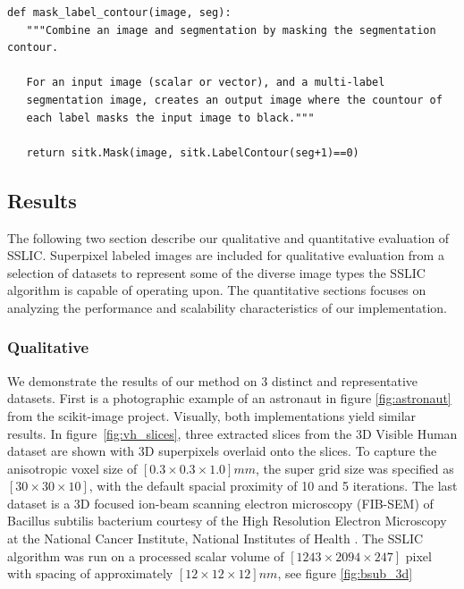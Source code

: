 \documentclass{InsightArticle}
\begin{document}
\begin{verbatim}
def mask_label_contour(image, seg):
   """Combine an image and segmentation by masking the segmentation contour.

   For an input image (scalar or vector), and a multi-label
   segmentation image, creates an output image where the countour of
   each label masks the input image to black."""

   return sitk.Mask(image, sitk.LabelContour(seg+1)==0)

\end{verbatim}


\subsection{Results}

The following two section describe our qualitative and quantitative evaluation
of SSLIC. Superpixel labeled images are included for qualitative evaluation from
a selection of datasets to represent some of the diverse image types the SSLIC
algorithm is capable of operating upon. The quantitative sections focuses on
analyzing the performance and scalability characteristics of our implementation.

\subsubsection{Qualitative}

We demonstrate the results of our method on 3 distinct and representative
datasets. First is a photographic example of an astronaut in figure \ref{fig:astronaut}
from the scikit-image\cite{scikit-image} project. Visually, both implementations yield similar
results. In figure~\ref{fig:vh_slices}, three extracted slices from the 3D Visible Human dataset are shown
with 3D superpixels overlaid onto the slices. To capture the
anisotropic voxel size of $[0.3 \times 0.3 \times 1.0]mm$, the super grid size
was specified as $[30 \times 30 \times 10]$, with the default spacial proximity
of 10 and 5 iterations. The last dataset is a 3D focused ion-beam scanning
electron microscopy (FIB-SEM) of Bacillus subtilis bacterium courtesy of the High
Resolution Electron Microscopy at the National Cancer Institute, National
Institutes of Health \cite{Narayan2015}. The SSLIC algorithm was run on a
processed scalar volume of $[ 1243 \times 2094 \times 247]$ pixel with spacing
of approximately $[12 \times 12 \times 12]nm$, see figure \ref{fig:bsub_3d}
\end{document}
